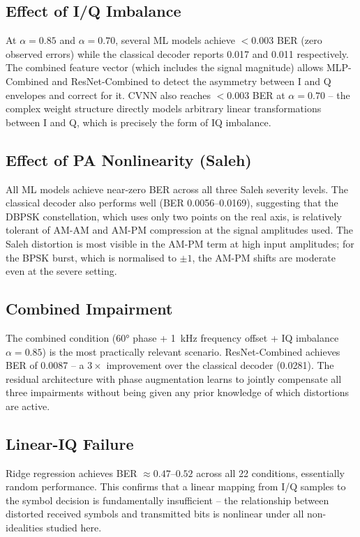 \documentclass[journal]{IEEEtran}
\begin{document}
\subsection{Effect of I/Q Imbalance}

At $\alpha = 0.85$ and $\alpha = 0.70$, several ML models achieve $<$0.003 BER
(zero observed errors) while the classical decoder reports 0.017 and 0.011 respectively. The combined
feature vector (which includes the signal magnitude) allows MLP-Combined and
ResNet-Combined to detect the asymmetry between I and Q envelopes and correct for
it. CVNN also reaches $<$0.003 BER at $\alpha = 0.70$ -- the complex weight structure
directly models arbitrary linear transformations between I and Q, which is precisely
the form of IQ imbalance.

\subsection{Effect of PA Nonlinearity (Saleh)}

All ML models achieve near-zero BER across all three Saleh severity levels. The
classical decoder also performs well (BER 0.0056--0.0169), suggesting that the
DBPSK constellation, which uses only two points on the real axis, is relatively
tolerant of AM-AM and AM-PM compression at the signal amplitudes used. The Saleh
distortion is most visible in the AM-PM term at high input amplitudes; for the
BPSK burst, which is normalised to $\pm 1$, the AM-PM shifts are moderate even at
the severe setting.

\subsection{Combined Impairment}

The combined condition (60° phase + \SI{1}{\kilo\hertz} frequency offset + IQ
imbalance $\alpha = 0.85$) is the most practically relevant scenario.
ResNet-Combined achieves BER of 0.0087 -- a $3\times$ improvement over the
classical decoder (0.0281). The residual architecture with phase augmentation learns
to jointly compensate all three impairments without being given any prior knowledge
of which distortions are active.

\subsection{Linear-IQ Failure}

Ridge regression achieves BER $\approx 0.47$--$0.52$ across all 22 conditions,
essentially random performance. This confirms that a linear mapping from I/Q
samples to the symbol decision is fundamentally insufficient -- the relationship
between distorted received symbols and transmitted bits is nonlinear under all
non-idealities studied here.
\end{document}
